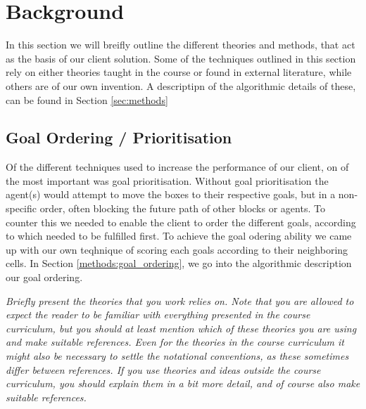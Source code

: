 \section{Background}
\label{sec:background}

In this section we will breifly outline the different theories and methods, that act as the basis of our client solution. Some of the techniques outlined in this section rely on either theories taught in the course or found in external literature, while others are of our own invention. A descriptipn of the algorithmic details of these, can be found in Section \ref{sec:methods}

\subsection{Goal Ordering / Prioritisation}
Of the different techniques used to increase the performance of our client, on of the most important was goal prioritisation. Without goal prioritisation the agent(s) would attempt to move the boxes to their respective goals, but in a non-specific order, often blocking the future path of other blocks or agents. To counter this we needed to enable the client to order the different goals, according to which needed to be fulfilled first. To achieve the goal odering ability we came up with our own teqhnique of scoring each goals according to their neighboring cells. In Section \ref{methods:goal_ordering}, we go into the algorithmic description our goal ordering.



\emph{Briefly present the theories that you work relies on. Note that you are allowed to expect the reader to be familiar with everything presented in the course curriculum, but you should at least mention which of these theories you are using and make suitable references. Even for the theories in the course curriculum it might also be necessary to settle the notational conventions, as these sometimes differ between references. If you use theories and ideas outside the course curriculum, you should explain them in a bit more detail, and of course also make suitable references.}
